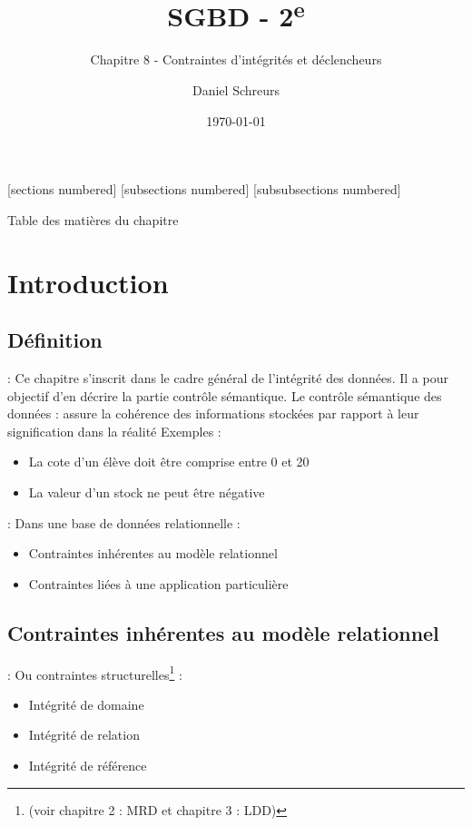 \documentclass[10pt]{beamer}
\title{SGBD - 2\textsuperscript{e}}
\subtitle{Chapitre 8 - Contraintes d'intégrités et déclencheurs}
\date{\today}
\author{Daniel Schreurs}
\institute{Haute École de la Province de Liège}
\begin{document}
\maketitle

[sections numbered]
[subsections numbered]
[subsubsections numbered]
\begin{frame}[allowframebreaks]{Table des matières du chapitre}
    \tableofcontents[subsectionstyle=show/show/hide,subsubsectionstyle=show/show/hide,]
\end{frame}

\section{Introduction}
\tocss
\subsection{Définition}
\begin{frame}{\secname : \subsecname}
    Ce chapitre s'inscrit dans le cadre général de l'intégrité des données.  Il a pour objectif d'en décrire la partie contrôle sémantique.
    Le contrôle sémantique des données : assure la cohérence des informations stockées par rapport à leur signification dans la réalité
    Exemples :
    \begin{itemize}
        \item La cote d'un élève doit être comprise entre 0 et 20
        \item La valeur d'un stock ne peut être négative
    \end{itemize}
\end{frame}

\begin{frame}{\secname : \subsecname}
    Dans une base de données relationnelle :
    \begin{itemize}
        \item Contraintes inhérentes au modèle relationnel
        \item Contraintes liées à une application particulière
    \end{itemize}
\end{frame}

\subsection{Contraintes inhérentes au modèle relationnel}
\begin{frame}{\secname : \subsecname}
    Ou contraintes structurelles\footnote{(voir chapitre 2  : MRD et chapitre 3 : LDD)
    } :
    \begin{itemize}
        \item Intégrité de domaine
        \item Intégrité de relation
        \item Intégrité de référence
    \end{itemize}
\end{frame}
\end{document}
